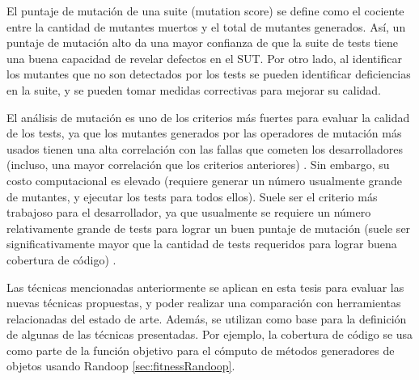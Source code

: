 El puntaje de mutación de una suite (mutation score) se define como
el cociente entre la cantidad de mutantes muertos y el total de mutantes
generados. Así, un puntaje de mutación alto da una mayor confianza de que la suite 
de tests tiene una buena capacidad de revelar defectos en el SUT. 
Por otro lado, al identificar los mutantes que no son detectados por los tests 
se pueden identificar deficiencias en la suite, y se pueden tomar medidas 
correctivas para mejorar su calidad.

El análisis de mutación es uno de los criterios más fuertes para evaluar la 
calidad de los tests, ya que los mutantes generados por las operadores de 
mutación más usados 
tienen una alta correlación con las fallas que cometen los desarrolladores 
(incluso, una mayor correlación que los criterios anteriores) \cite{}. Sin
embargo, su costo computacional es elevado (requiere generar un
número usualmente grande de mutantes, y ejecutar los tests para todos ellos). 
Suele ser el criterio más trabajoso para el desarrollador, ya que usualmente 
se requiere un número relativamente grande de tests para lograr un buen puntaje 
de mutación (suele ser significativamente mayor que la cantidad de tests
    requeridos para lograr buena cobertura de código) \cite{}.

Las técnicas mencionadas anteriormente se aplican en esta tesis para evaluar las 
nuevas técnicas propuestas, y poder realizar una comparación con herramientas
relacionadas del estado de arte. Además, se utilizan como base para la
definición de algunas de las técnicas presentadas. Por ejemplo, la cobertura de
código se usa como parte de la función objetivo para el cómputo de métodos
generadores de objetos usando Randoop \ref{sec:fitnessRandoop}.
